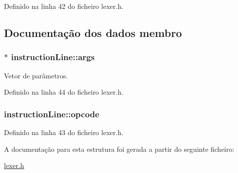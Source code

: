 Definido na linha 42 do ficheiro lexer.\-h.



\subsection{Documentação dos dados membro}
\hypertarget{structinstruction_line_ab6b4be43f89da78d09a9469f952435c7}{
\subsubsection[{args}]{$\ast$ instruction\-Line\-::args}}\label{structinstruction_line_ab6b4be43f89da78d09a9469f952435c7}


Vetor de parâmetros. 



Definido na linha 44 do ficheiro lexer.\-h.

\hypertarget{structinstruction_line_a309feca274873683d12f90cf0bd81780}{
\subsubsection[{opcode}]{ instruction\-Line\-::opcode}}\label{structinstruction_line_a309feca274873683d12f90cf0bd81780}


Definido na linha 43 do ficheiro lexer.\-h.



A documentação para esta estrutura foi gerada a partir do seguinte ficheiro\-:\begin{DoxyCompactItemize}
\item 
\hyperlink{lexer_8h}{lexer.\-h}\end{DoxyCompactItemize}
